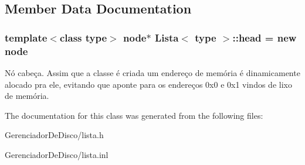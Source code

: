 \subsection{Member Data Documentation}
\hypertarget{classLista_acc29e448aa48540bb4f070661a52bc60}{
\subsubsection[{head}]{\setlength{\rightskip}{0pt plus 5cm}template$<$class type$>$ {\bf node}$\ast$ {\bf Lista}$<$ type $>$\+::head = new {\bf node}}}\label{classLista_acc29e448aa48540bb4f070661a52bc60}
Nó cabeça. Assim que a classe é criada um endereço de memória é dinamicamente alocado pra ele, evitando que aponte para os endereços 0x0 e 0x1 vindos de lixo de memória. 

The documentation for this class was generated from the following files\+:\begin{DoxyCompactItemize}
\item 
Gerenciador\+De\+Disco/lista.\+h\item 
Gerenciador\+De\+Disco/lista.\+inl\end{DoxyCompactItemize}
